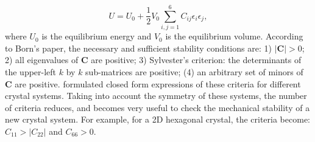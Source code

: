 \begin{equation}
U=U_0+\frac{1}{2}V_0\sum_{i,j=1}^6 C_{ij}\epsilon_i\epsilon_j,
\end{equation}
where $U_0$ is the equilibrium energy and $V_0$ is the equilibrium volume. According to Born's paper\cite{born_1940}, the necessary and sufficient stability conditions are: 1) $|\mathbf{C}|>0$; 2) all eigenvalues of $\mathbf{C}$ are positive; 3) Sylvester’s criterion: the determinants of the upper-left $k$ by $k$ sub-matrices are positive; (4) an arbitrary set of minors of $\mathbf{C}$ are positive. \citet{Mouhat2014} formulated closed form expressions of these criteria for different crystal systems. Taking into account the symmetry of these systems, the number of criteria reduces, and becomes very useful to check the mechanical stability of a new crystal system. For example, for a 2D hexagonal crystal, the criteria become: $C_{11}>|C_{22}|$ and $C_{66}>0$.
